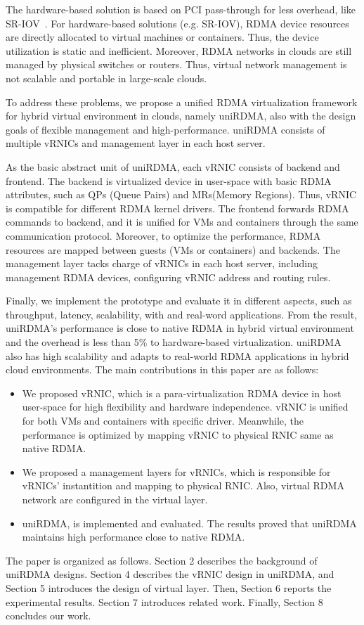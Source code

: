 The hardware-based solution is based on PCI pass-through for less overhead, like SR-IOV~\cite{sr-iov}. For hardware-based solutions (e.g. SR-IOV), RDMA device resources are directly allocated to virtual machines or containers. Thus, the device utilization is static and inefficient. Moreover, RDMA networks in clouds are still managed by physical switches or routers. Thus, virtual network management is not scalable and portable in large-scale clouds.

To address these problems, we propose a unified RDMA virtualization framework for hybrid virtual environment in clouds, namely uniRDMA, also with the design goals of flexible management and high-performance. uniRDMA consists of multiple vRNICs and management layer in each host server.

As the basic abstract unit of uniRDMA, each vRNIC consists of backend and frontend. The backend is virtualized device in user-space with basic RDMA attributes, such as QPs (Queue Pairs) and MRs(Memory Regions). Thus, vRNIC is compatible for different RDMA kernel drivers. The frontend forwards RDMA commands to backend, and it is unified for VMs and containers through the same communication protocol. Moreover, to optimize the performance, RDMA resources are mapped between guests (VMs or containers) and backends. The management layer tacks charge of vRNICs in each host server, including management RDMA devices, configuring vRNIC address and routing rules. 

Finally, we implement the prototype and evaluate it in different aspects, such as throughput, latency, scalability, with and real-word applications. From the result, uniRDMA's performance is close to native RDMA in hybrid virtual environment and the overhead is less than 5\% to hardware-based virtualization. uniRDMA also has high scalability and adapts to real-world RDMA applications in hybrid cloud environments. The main contributions in this paper are as follows:

\begin{itemize}
\item We proposed vRNIC, which is a para-virtualization RDMA device in host user-space for high flexibility and hardware independence. vRNIC is unified for both VMs and containers with specific driver. Meanwhile, the performance is optimized by mapping vRNIC to physical RNIC same as native RDMA.

\item We proposed a management layers for vRNICs, which is responsible for vRNICs' instantition and mapping to physical RNIC. Also, virtual RDMA network are configured in the virtual layer.

\item uniRDMA, is implemented and evaluated. The results proved that uniRDMA maintains high performance close to native RDMA.
\end{itemize}

The paper is organized as follows. Section 2 describes the background of uniRDMA designs. Section 4 describes the vRNIC design in uniRDMA, and Section 5 introduces the design of virtual layer. Then, Section 6 reports the experimental results. Section 7 introduces related work. Finally, Section 8 concludes our work.
